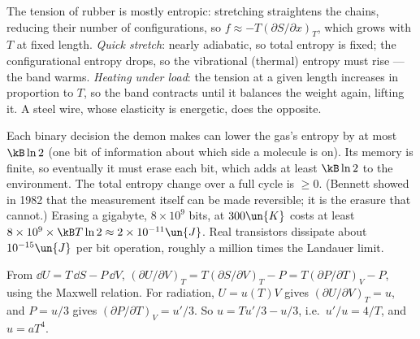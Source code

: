  The tension of rubber is mostly entropic: stretching straightens the chains, reducing their number of configurations, so $f\approx-T(\partial S/\partial x)_T$, which grows with $T$ at fixed length. \emph{Quick stretch}: nearly adiabatic, so total entropy is fixed; the configurational entropy drops, so the vibrational (thermal) entropy must rise --- the band warms. \emph{Heating under load}: the tension at a given length increases in proportion to $T$, so the band contracts until it balances the weight again, lifting it. A steel wire, whose elasticity is energetic, does the opposite.

 Each binary decision the demon makes can lower the gas's entropy by at most $\kB\ln2$ (one bit of information about which side a molecule is on). Its memory is finite, so eventually it must erase each bit, which adds at least $\kB\ln2$ to the environment. The total entropy change over a full cycle is $\ge0$. (Bennett showed in 1982 that the measurement itself can be made reversible; it is the erasure that cannot.) Erasing a gigabyte, $8\times10^9$ bits, at $300\un{K}$ costs at least $8\times10^9\times\kB T\ln2\approx2\times10^{-11}\un{J}$. Real transistors dissipate about $10^{-15}\un{J}$ per bit operation, roughly a million times the Landauer limit.

 From $\dd U = T\,\dd S - P\,\dd V$, $(\partial U/\partial V)_T = T(\partial S/\partial V)_T - P = T(\partial P/\partial T)_V - P$, using the Maxwell relation. For radiation, $U = u(T)V$ gives $(\partial U/\partial V)_T = u$, and $P = u/3$ gives $(\partial P/\partial T)_V = u'/3$. So $u = Tu'/3 - u/3$, i.e.\ $u'/u = 4/T$, and $u = aT^4$.
